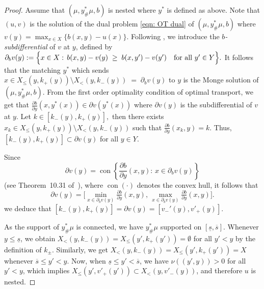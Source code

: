 \documentclass[12pt,reqno]{amsart}
\begin{document}
\begin{proof}

Assume that $(\mu,y^*_\#\mu,b)$ is nested where $y^*$ is defined as above.  Note that $(u,v)$  is the solution of the dual problem \eqref{eqn: OT dual} of $(\mu,y^*_\#\mu,b)$  where $v(y)=\max_{x\in X}\{b(x,y)-u(x)\}.$    Following \cite{ChiapporiMcCannPass17}, we introduce the \emph{$b$-subdifferential} of $v$ at $y$, defined by 
\(
\partial_b v(y) := \Bigl\{x \in X : \, b(x,y)-v(y) \;\ge\; b(x,y')-v(y') \quad \text{for all } y'\in Y \Bigr\}.
\)  
It follows that the matching $y^*$ which sends
$x \in X_\le(y,k_+(y)) \setminus X_<(y,k_-(y)) \;=\; \partial_b v(y)$
to $y$ is the Monge solution of $(\mu,y^*_\#\mu,b)$. From the first  order optimality condition of optimal transport, we get that $\frac{\partial b}{\partial y}(x,y^*(x))\in \partial v(y^*(x))$ where $\partial v(y)$ is the subdifferential of $v$ at $y.$ Let $k\in[k_-(y),k_+(y)],$ then there exists $x_k\in  X_\le(y,k_+(y))\setminus X_<(y,k_-(y))$ such that $\frac{\partial b}{\partial y}(x_k,y)=k.$ Thus, $[k_-(y),k_+(y)] \subset \partial v(y)$ for all $y\in Y.$ 

Since 
\[
\partial v(y)
= \operatorname{con}\left\{
\frac{\partial b}{\partial y}(x,y) :\, x \in \partial_b v(y)
\right\}
\]
(see Theorem~10.31 of~\cite{RockafellarWets1998}), 
where $\operatorname{con}(\cdot)$ denotes the convex hull, 
it follows that
\[
\partial v(y)
= \bigl[
\min_{x \in \partial_b v(y)} \tfrac{\partial b}{\partial y}(x,y),\,
\max_{x \in \partial_b v(y)} \tfrac{\partial b}{\partial y}(x,y)
\bigr].
\]
we deduce that $[k_-(y),k_+(y)] = \partial v(y)=[v_-'(y),v'_+(y)].$ 

As the support of \(y^*_\#\mu\) is connected, we have 
\(y^*_\#\mu\) supported on \([\underline{s}, \overline{s}]\).  
Whenever \(y \le \underline{s}\), we obtain 
\(X_{<}(y, k_-(y)) = X_{\le}(y', k_+(y')) = \emptyset\) 
for all \(y' < y\) by the definition of \(k_{\pm}\).  
Similarly, we get \(X_{<}(y, k_-(y)) = X_{\le}(y', k_+(y')) = X\) 
whenever \(\overline{s} \le y' < y\).  
Now, when \(\underline{s} \le y' < \overline{s}\), we have \(\nu((y',y)) > 0\) for all $y'<y$, 
which implies \(X_{\le}(y', v'_+(y')) \subset X_{<}(y, v'_-(y))\), 
and therefore \(u\) is nested.  %


\end{proof}
\end{document}
